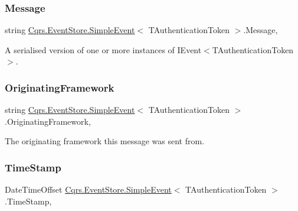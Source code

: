 \subsubsection{\texorpdfstring{Message}{Message}}
{\footnotesize\ttfamily string \hyperlink{classCqrs_1_1EventStore_1_1SimpleEvent}{Cqrs.\+Event\+Store.\+Simple\+Event}$<$ T\+Authentication\+Token $>$.Message\hspace{0.3cm}{\ttfamily [get]}, {\ttfamily [set]}}



A serialised version of one or more instances of I\+Event$<$\+T\+Authentication\+Token$>$. 

\mbox{\label{classCqrs_1_1EventStore_1_1SimpleEvent_a3b365c5f9a7ee4491e01a463dca178b7_a3b365c5f9a7ee4491e01a463dca178b7}} 
\subsubsection{\texorpdfstring{Originating\+Framework}{OriginatingFramework}}
{\footnotesize\ttfamily string \hyperlink{classCqrs_1_1EventStore_1_1SimpleEvent}{Cqrs.\+Event\+Store.\+Simple\+Event}$<$ T\+Authentication\+Token $>$.Originating\+Framework\hspace{0.3cm}{\ttfamily [get]}, {\ttfamily [set]}}



The originating framework this message was sent from. 

\mbox{\label{classCqrs_1_1EventStore_1_1SimpleEvent_a47ab7f023f640dbfe6a1f1395a94b147_a47ab7f023f640dbfe6a1f1395a94b147}} 
\subsubsection{\texorpdfstring{Time\+Stamp}{TimeStamp}}
{\footnotesize\ttfamily Date\+Time\+Offset \hyperlink{classCqrs_1_1EventStore_1_1SimpleEvent}{Cqrs.\+Event\+Store.\+Simple\+Event}$<$ T\+Authentication\+Token $>$.Time\+Stamp\hspace{0.3cm}{\ttfamily [get]}, {\ttfamily [set]}}



